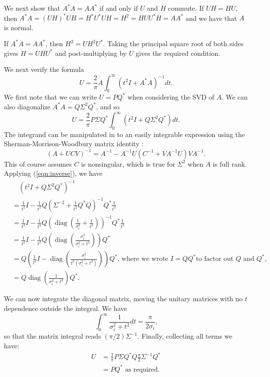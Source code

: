 \documentclass[12pt]{article}
\def\diag{\mathop{\mathrm{diag}}}     %
\begin{document}
We next show that $A^*A = AA^*$ if and only if $U$ and $H$ commute.
If $UH=HU$, then $A^*A = (UH)^*UH = H^*U^*UH = H^2 = HUU^*H = AA^*$
and we have that $A$ is normal.

If $A^*A = AA^*$, then $H^2 = UH^2U^*$. Taking the principal square root of
both sides gives $H = UHU^*$ and post-multiplying by $U$ gives the required
condition.

We next verify the formula
\begin{equation} \label{eqn:U-integral}
  U = \frac{2}{\pi}A\int_{0}^{\infty}(t^2I + A^*A)^{-1}dt\text{.}
\end{equation}
We first note that we can write $U=PQ^*$ when considering the SVD of $A$. We
can also diagonalize $A^*A = Q\Sigma^2 Q^*$, and so
\begin{equation}
  U = \frac{2}{\pi}P\Sigma Q^*\int_0^{\infty}(t^2I + Q\Sigma^2 Q^*)dt\text{.}
\end{equation}
The integrand can be manipulated in to an easily integrable expression using the
Sherman-Morrison-Woodbury matrix identity \cite{high:ASNA2}:
\begin{equation}\label{eqn:inverse}
  (A+UCV)^{-1} = A^{-1} - A^{-1}U(C^{-1} + VA^{-1}U)VA^{-1}\text{.}
\end{equation}
This of course assumes $C$ is nonsingular, which is true for $\Sigma^2$ when $A$
is full rank. Applying (\ref{eqn:inverse}), we have
\begin{align*}
  &\quad (t^2I + Q\Sigma^2Q^*)^{-1} \\
  & = \frac{1}{t^2}I - \frac{1}{t^2}Q(\Sigma^{-2} + \frac{1}{t^2}Q^*Q)^{-1}Q^*\frac{1}{t^2} \\
  & = \frac{1}{t^2}I - \frac{1}{t^2}Q(\diag(\frac{1}{\sigma_i^2}
    + \frac{1}{t^2}))^{-1}Q^*\frac{1}{t^2} \\
  & = \frac{1}{t^2}I - \frac{1}{t^2}Q(\diag(\frac{\sigma_i^2}{\sigma_i^2 + t^2}))Q^* \\
  & = Q(\frac{1}{t^2}I - \diag(\frac{\sigma_i^2}{t^2(\sigma_i^2 + t^2)}))Q^*
    \text{, where we wrote } I = QQ^*
  \text{to factor out } Q\text{ and } Q^*\text{,}\\
  & = Q\diag(\frac{1}{\sigma_i^2 + t^2})Q^*\text{.}
\end{align*}

We can now integrate the diagonal matrix, moving the unitary matrices with no
$t$ dependence outside the integral. We have
\begin{equation}
  \int_0^{\infty}\frac{1}{\sigma_i^2+t^2}dt = \frac{\pi}{2\sigma_i}\text{,}
\end{equation}
so that the matrix integral reads $(\pi /2)\Sigma^{-1}$.
Finally, collecting all terms we have:
\begin{align*}
  U & = \frac{2}{\pi}P\Sigma Q^*Q\frac{\pi}{2}\Sigma^{-1}Q^* \\
    & = PQ^* \text{ as required.}
\end{align*}
\end{document}

